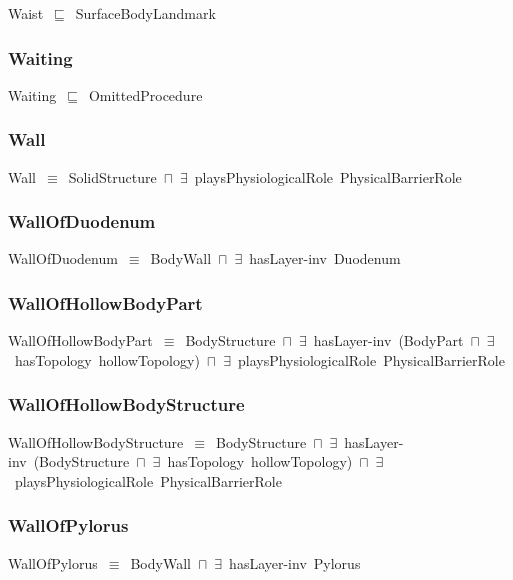 \documentclass{article}
\begin{document}
Waist~\ensuremath{\sqsubseteq}~SurfaceBodyLandmark~

\subsubsection*{Waiting}

Waiting~\ensuremath{\sqsubseteq}~OmittedProcedure~

\subsubsection*{Wall}

Wall~\ensuremath{\equiv}~SolidStructure~\ensuremath{\sqcap}~\ensuremath{\exists}~playsPhysiologicalRole~PhysicalBarrierRole

\subsubsection*{WallOfDuodenum}

WallOfDuodenum~\ensuremath{\equiv}~BodyWall~\ensuremath{\sqcap}~\ensuremath{\exists}~hasLayer-inv~Duodenum

\subsubsection*{WallOfHollowBodyPart}

WallOfHollowBodyPart~\ensuremath{\equiv}~BodyStructure~\ensuremath{\sqcap}~\ensuremath{\exists}~hasLayer-inv~(BodyPart~\ensuremath{\sqcap}~\ensuremath{\exists}~hasTopology~hollowTopology)~\ensuremath{\sqcap}~\ensuremath{\exists}~playsPhysiologicalRole~PhysicalBarrierRole

\subsubsection*{WallOfHollowBodyStructure}

WallOfHollowBodyStructure~\ensuremath{\equiv}~BodyStructure~\ensuremath{\sqcap}~\ensuremath{\exists}~hasLayer-inv~(BodyStructure~\ensuremath{\sqcap}~\ensuremath{\exists}~hasTopology~hollowTopology)~\ensuremath{\sqcap}~\ensuremath{\exists}~playsPhysiologicalRole~PhysicalBarrierRole

\subsubsection*{WallOfPylorus}

WallOfPylorus~\ensuremath{\equiv}~BodyWall~\ensuremath{\sqcap}~\ensuremath{\exists}~hasLayer-inv~Pylorus
\end{document}
